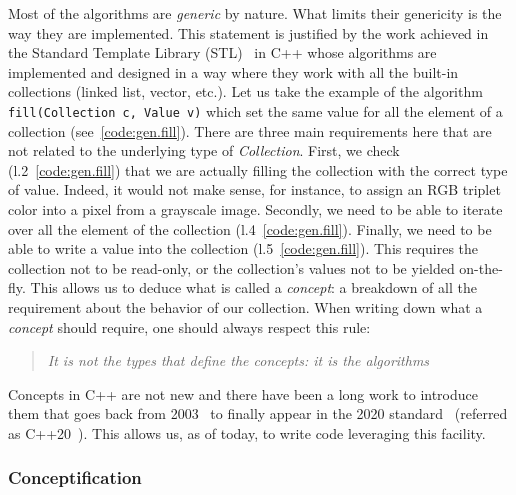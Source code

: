 Most of the algorithms are \emph{generic} by nature. What limits their genericity is the way they are implemented. This
statement is justified by the work achieved in the Standard Template Library (STL)~\parencite{dehnert.1998.fundamentals}
in C++ whose algorithms are implemented and designed in a way where they work with all the built-in collections (linked
list, vector, etc.). Let us take the example of the algorithm \texttt{fill(Collection c, Value v)} which set the same
value for all the element of a collection (see~\cref{code:gen.fill}). There are three main requirements here that are
not related to the underlying type of \emph{Collection}. First, we check (l.2~\cref{code:gen.fill}) that we are actually
filling the collection with the correct type of value. Indeed, it would not make sense, for instance, to assign an RGB
triplet color into a pixel from a grayscale image. Secondly, we need to be able to iterate over all the element of the
collection (l.4~\cref{code:gen.fill}). Finally, we need to be able to write a value into the collection
(l.5~\cref{code:gen.fill}). This requires the collection not to be read-only, or the collection's values not to be
yielded on-the-fly. This allows us to deduce what is called a \emph{concept}: a breakdown of all the requirement about
the behavior of our collection. When writing down what a \emph{concept} should require, one should always respect this
rule: \blockquote{\emph{It is not the types that define the concepts: it is the algorithms}}. Concepts in C++ are not
new and there have been a long work to introduce them that goes back from
2003~\parencite{seymour.2009.concepts,stroustrup.2003.concepts,sutton.2017.concepts} to finally appear in the 2020
standard~\parencite{voutilainen.2017.concepts} (referred as C++20~\parencite{iso.2011.cpp}). This allows us, as of
today, to write code leveraging this facility.

\subsubsection{Conceptification}
\label{subsec:conceptification}


